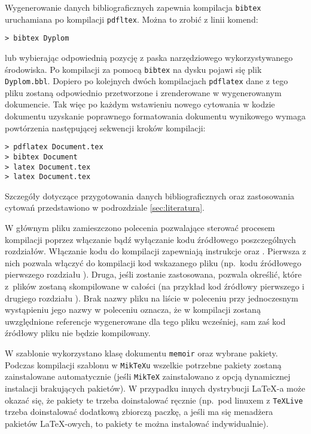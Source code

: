 Wygenerowanie danych bibliograficznych zapewnia kompilacja \texttt{bibtex} uruchamiana po kompilacji \texttt{pdfltex}. Można to zrobić z linii komend:
\begin{lstlisting}[basicstyle=\ttfamily]
> bibtex Dyplom
\end{lstlisting}
lub wybierając odpowiednią pozycję z paska narzędziowego wykorzystywanego środowiska. Po kompilacji za pomocą \texttt{bibtex} na dysku pojawi się plik \texttt{Dyplom.bbl}. Dopiero po kolejnych dwóch kompilacjach \texttt{pdflatex} dane z tego pliku zostaną odpowiednio przetworzone i zrenderowane w wygenerowanym dokumencie. Tak więc po każdym wstawieniu nowego cytowania w kodzie dokumentu uzyskanie poprawnego formatowania dokumentu wynikowego wymaga powtórzenia następującej sekwencji kroków kompilacji:
\begin{lstlisting}[basicstyle=\ttfamily]
> pdflatex Document.tex
> bibtex Document
> latex Document.tex
> latex Document.tex
\end{lstlisting}
Szczegóły dotyczące przygotowania danych bibliograficznych oraz zastosowania cytowań przedstawiono w podrozdziale \ref{sec:literatura}.

W głównym pliku zamieszczono polecenia pozwalające sterować procesem kompilacji poprzez włączanie bądź wyłączanie kodu źródłowego poszczególnych rozdziałów. Włączanie kodu do kompilacji zapewniają instrukcje \verb++ oraz \verb++. Pierwsza z nich pozwala włączyć do kompilacji kod wskazanego pliku (np.\ kodu źródłowego pierwszego rozdziału \verb++). Druga, jeśli zostanie zastosowana, pozwala określić, które z~plików zostaną skompilowane w całości (na przykład kod źródłowy pierwszego i drugiego rozdziału \verb++). Brak nazwy pliku na liście w poleceniu \verb++ przy jednoczesnym wystąpieniu jego nazwy w poleceniu \verb++ oznacza, że w kompilacji zostaną uwzględnione referencje wygenerowane dla tego pliku wcześniej, sam zaś kod źródłowy pliku nie będzie kompilowany. 

W szablonie wykorzystano klasę dokumentu \texttt{memoir} oraz wybrane pakiety. Podczas kompilacji szablonu w \texttt{MikTeXu} wszelkie potrzebne pakiety zostaną zainstalowane automatycznie (jeśli \texttt{MikTeX} zainstalowano z opcją dynamicznej instalacji brakujących pakietów). W przypadku innych dystrybucji \LaTeX-a może okazać się, że pakiety te trzeba doinstalować ręcznie (np.\ pod linuxem z \texttt{TeXLive} trzeba doinstalować dodatkową zbiorczą paczkę, a jeśli ma się menadżera pakietów \LaTeX-owych, to pakiety te można instalować indywidualnie).

